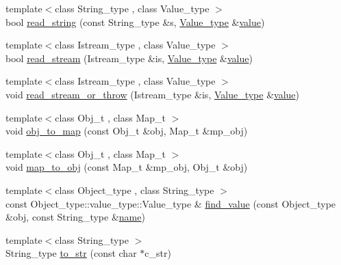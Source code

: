 \begin{DoxyCompactItemize}
\item 
{\footnotesize template$<$class String\+\_\+type , class Value\+\_\+type $>$ }\\bool \hyperlink{namespacejson__spirit_ad3468273008e225785eda58e04f534fe}{read\+\_\+string} (const String\+\_\+type \&s, \hyperlink{namespacejson__spirit_aeaad57c912e0370a76f60cd510ad3d74}{Value\+\_\+type} \&\hyperlink{cache_8cc_a0f61d63b009d0880a89c843bd50d8d76}{value})
\item 
{\footnotesize template$<$class Istream\+\_\+type , class Value\+\_\+type $>$ }\\bool \hyperlink{namespacejson__spirit_a89befb0829356b903a7379244f1c6a12}{read\+\_\+stream} (Istream\+\_\+type \&is, \hyperlink{namespacejson__spirit_aeaad57c912e0370a76f60cd510ad3d74}{Value\+\_\+type} \&\hyperlink{cache_8cc_a0f61d63b009d0880a89c843bd50d8d76}{value})
\item 
{\footnotesize template$<$class Istream\+\_\+type , class Value\+\_\+type $>$ }\\void \hyperlink{namespacejson__spirit_ac36ae8d0e650f1d2cd0f1b1baf83bbbe}{read\+\_\+stream\+\_\+or\+\_\+throw} (Istream\+\_\+type \&is, \hyperlink{namespacejson__spirit_aeaad57c912e0370a76f60cd510ad3d74}{Value\+\_\+type} \&\hyperlink{cache_8cc_a0f61d63b009d0880a89c843bd50d8d76}{value})
\item 
{\footnotesize template$<$class Obj\+\_\+t , class Map\+\_\+t $>$ }\\void \hyperlink{namespacejson__spirit_afeba4f344890a112ac7d993485f0aca2}{obj\+\_\+to\+\_\+map} (const Obj\+\_\+t \&obj, Map\+\_\+t \&mp\+\_\+obj)
\item 
{\footnotesize template$<$class Obj\+\_\+t , class Map\+\_\+t $>$ }\\void \hyperlink{namespacejson__spirit_a1a00c9c1df066be75ea6bc7be155a22e}{map\+\_\+to\+\_\+obj} (const Map\+\_\+t \&mp\+\_\+obj, Obj\+\_\+t \&obj)
\item 
{\footnotesize template$<$class Object\+\_\+type , class String\+\_\+type $>$ }\\const Object\+\_\+type\+::value\+\_\+type\+::\+Value\+\_\+type \& \hyperlink{namespacejson__spirit_a74f681114641f2ca6250370280ee1089}{find\+\_\+value} (const Object\+\_\+type \&obj, const String\+\_\+type \&\hyperlink{testharness_8cc_a8f8f80d37794cde9472343e4487ba3eb}{name})
\item 
{\footnotesize template$<$class String\+\_\+type $>$ }\\String\+\_\+type \hyperlink{namespacejson__spirit_aaf952c34ac6bef11bec49187a0be04f1}{to\+\_\+str} (const char $\ast$c\+\_\+str)

\end{DoxyCompactItemize}
